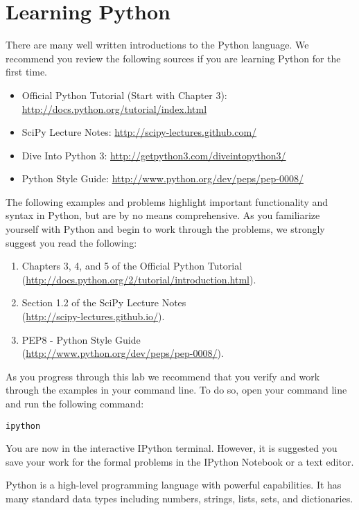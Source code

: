 \section*{Learning Python}
There are many well written introductions to the Python language.
We recommend you review the following sources if you are learning Python for the
first time.

\begin{itemize}
\item Official Python Tutorial (Start with Chapter 3): 
\url{http://docs.python.org/tutorial/index.html} 
\item SciPy Lecture Notes: \url{http://scipy-lectures.github.com/}
\item Dive Into Python 3: \url{http://getpython3.com/diveintopython3/}
\item Python Style Guide: \url{http://www.python.org/dev/peps/pep-0008/}
\end{itemize}

The following examples and problems highlight important functionality
and syntax in Python, but are by no means comprehensive.
As you familiarize yourself with Python and begin to work through the problems,  
we strongly suggest you read the following:
\begin{enumerate}
\item Chapters 3, 4, and 5 of the Official Python Tutorial \\
        (\url{http://docs.python.org/2/tutorial/introduction.html}).
\item Section 1.2 of the SciPy Lecture Notes \\
        (\url{http://scipy-lectures.github.io/}).
\item PEP8 - Python Style Guide \\
        (\url{http://www.python.org/dev/peps/pep-0008/}).
\end{enumerate}


As you progress through this lab we recommend that you verify and work 
through the examples in your command line. 
To do so, open your command line and run the following command: 
\begin{lstlisting}
ipython
\end{lstlisting}
You are now in the interactive IPython terminal.
However, it is suggested you save your work for the formal problems in the 
IPython Notebook or a text editor. 

Python is a high-level programming language with powerful capabilities. 
It has many standard data types including numbers, strings, lists, sets, and dictionaries. 

